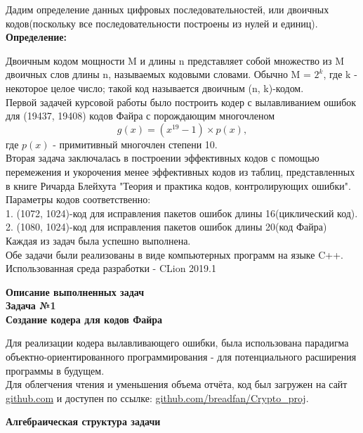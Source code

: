 \documentclass{article}
\begin{document}
            Дадим определение данных цифровых последовательностей, или двоичных кодов(поскольку все последовательности построены из нулей и единиц).\\
            
            \textbf{Определение:}
            
            	Двоичным кодом мощности M и длины n представляет собой множество из M двоичных слов длины n, называемых кодовыми словами. Обычно M = $2^k$, где k - некоторое целое число; такой код называется двоичным (n, k)-кодом.\\
           
           	Первой задачей курсовой работы было построить кодер с вылавливанием ошибок для (19437, 19408) кодов Файра с порождающим многочленом $$g(x) = (x^{19} - 1) \times p(x),$$ где $p(x)$ - примитивный многочлен степени 10. \\ 
           	
           	Вторая задача заключалась в построении эффективных кодов с помощью перемежения и укорочения менее эффективных кодов из таблиц, представленных в книге Ричарда Блейхута "Теория и практика кодов, контролирующих ошибки". 
           	\\Параметры кодов соответственно:\\ 1. (1072, 1024)-код для исправления пакетов ошибок длины 16(циклический код).\\2. (1080, 1024)-код для исправления пакетов ошибок длины 20(код Файра)\\
           	
           	Каждая из задач была успешно выполнена.\\
           	Обе задачи были реализованы в виде компьютерных программ на языке C++. Использованная среда разработки - CLion 2019.1 
        
        
    \newpage
        \begin{center}
            \large \textbf {Описание выполненных задач}\\
            \large \textbf {Задача №1}\\
            \large \textbf {Создание кодера для кодов Файра}
        \end{center}
    
    	Для реализации кодера вылавливающего ошибки, была использована парадигма объектно-ориентированного программирования - для потенциального расширения программы в будущем.\\
    	
    	Для облегчения чтения и уменьшения объема отчёта, код был загружен на сайт \href{https://github.com}{github.com} и доступен по ссылке:
    	\href{https://github.com/breadfan/Crypto_proj}{github.com/breadfan/Crypto\_proj}.\\
       	\begin{center}
       		\large \textbf {Алгебраическая структура задачи}
        \end{center}	
        
\end{document}
